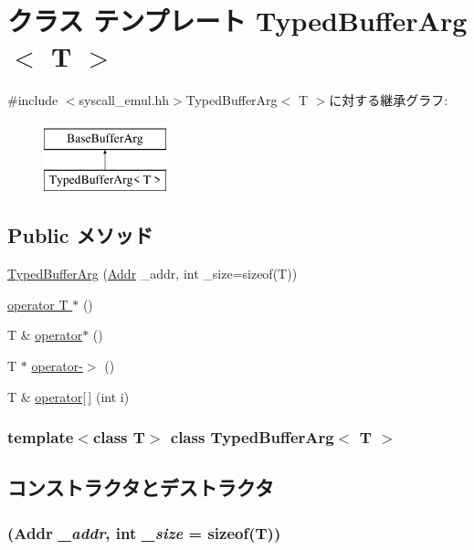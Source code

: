 \hypertarget{classTypedBufferArg}{
\section{クラス テンプレート TypedBufferArg$<$ T $>$}
\label{classTypedBufferArg}
}


{\ttfamily \#include $<$syscall\_\-emul.hh$>$}TypedBufferArg$<$ T $>$に対する継承グラフ:\begin{figure}[H]
\begin{center}
\leavevmode
\includegraphics[height=2cm]{classTypedBufferArg}
\end{center}
\end{figure}
\subsection*{Public メソッド}
\begin{DoxyCompactItemize}
\item 
\hyperlink{classTypedBufferArg_af078b42e8efc13509045b1b1179fb568}{TypedBufferArg} (\hyperlink{base_2types_8hh_af1bb03d6a4ee096394a6749f0a169232}{Addr} \_\-addr, int \_\-size=sizeof(T))
\item 
\hyperlink{classTypedBufferArg_a4e20322854ce5d78776cdaf1a87aacd9}{operator T $\ast$} ()
\item 
T \& \hyperlink{classTypedBufferArg_af7f8c6b921dca2b94f6e7ee14e762770}{operator$\ast$} ()
\item 
T $\ast$ \hyperlink{classTypedBufferArg_af6e485beee07fd401de29c8cdf898c69}{operator-\/$>$} ()
\item 
T \& \hyperlink{classTypedBufferArg_a0534e977fc9fee424b3ef94f27a9ed61}{operator\mbox{[}$\,$\mbox{]}} (int i)
\end{DoxyCompactItemize}
\subsubsection*{template$<$class T$>$ class TypedBufferArg$<$ T $>$}



\subsection{コンストラクタとデストラクタ}
\hypertarget{classTypedBufferArg_af078b42e8efc13509045b1b1179fb568}{
\subsubsection[{TypedBufferArg}]{ ({\bf Addr} {\em \_\-addr}, \/  int {\em \_\-size} = {\ttfamily sizeof(T)})}}
\label{classTypedBufferArg_af078b42e8efc13509045b1b1179fb568}



